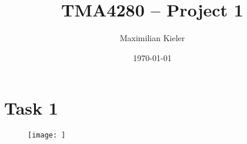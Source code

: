 







\title{TMA4280 -- Project 1}
\author{Maximilian Kieler}
\date{\today}

\maketitle



\section{Task 1}

\begin{figure}[h] 
  \centering
     \texttt{[image: ]}
  \caption{}
  \label{fig:task1}
\end{figure}



